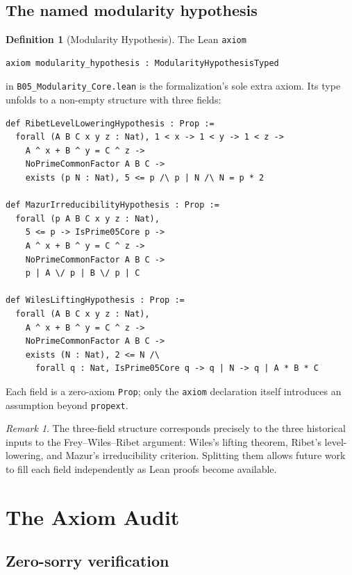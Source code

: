 \documentclass[12pt,reqno]{amsart}
\theoremstyle{plain}
\theoremstyle{definition}
\newtheorem{definition}[theorem]{Definition}
\theoremstyle{remark}
\newtheorem{remark}[theorem]{Remark}
\begin{document}
\subsection{The named modularity hypothesis}
\label{def:modularity-hyp}

\begin{definition}[Modularity Hypothesis]
The Lean \texttt{axiom}
\begin{lstlisting}
axiom modularity_hypothesis : ModularityHypothesisTyped
\end{lstlisting}
in \texttt{B05\_Modularity\_Core.lean} is the formalization's sole extra
axiom. Its type unfolds to a non-empty structure with three fields:
\begin{lstlisting}
def RibetLevelLoweringHypothesis : Prop :=
  forall (A B C x y z : Nat), 1 < x -> 1 < y -> 1 < z ->
    A ^ x + B ^ y = C ^ z ->
    NoPrimeCommonFactor A B C ->
    exists (p N : Nat), 5 <= p /\ p | N /\ N = p * 2

def MazurIrreducibilityHypothesis : Prop :=
  forall (p A B C x y z : Nat),
    5 <= p -> IsPrime05Core p ->
    A ^ x + B ^ y = C ^ z ->
    NoPrimeCommonFactor A B C ->
    p | A \/ p | B \/ p | C

def WilesLiftingHypothesis : Prop :=
  forall (A B C x y z : Nat),
    A ^ x + B ^ y = C ^ z ->
    NoPrimeCommonFactor A B C ->
    exists (N : Nat), 2 <= N /\
      forall q : Nat, IsPrime05Core q -> q | N -> q | A * B * C
\end{lstlisting}
Each field is a zero-axiom \texttt{Prop}; only the \texttt{axiom}
declaration itself introduces an assumption beyond \texttt{propext}.
\end{definition}

\begin{remark}
The three-field structure corresponds precisely to the three
historical inputs to the Frey--Wiles--Ribet argument:
Wiles's lifting theorem, Ribet's level-lowering, and Mazur's
irreducibility criterion. Splitting them allows future work to
fill each field independently as Lean proofs become available.
\end{remark}

\section{The Axiom Audit}
\label{sec:audit}

\subsection{Zero-sorry verification}
\end{document}
